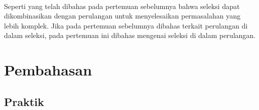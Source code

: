 \documentclass[a4paper,12pt]{article}
\begin{document}
\paragraph{}
Seperti yang telah dibahas pada pertemuan sebelumnya bahwa seleksi dapat dikombinasikan
dengan perulangan untuk menyelesaikan permasalahan yang lebih komplek. Jika pada
pertemuan sebelumnya dibahas terkait perulangan di dalam seleksi, pada pertemuan ini dibahas
mengenai seleksi di dalam perulangan.

\newpage

\section{Pembahasan}
\subsection{Praktik}
\end{document}
